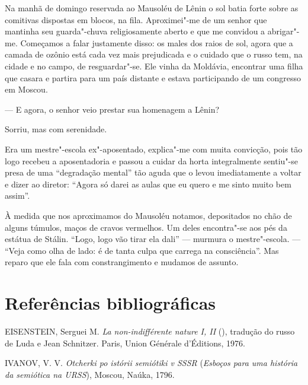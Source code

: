 Na manhã de domingo reservada ao Mausoléu de Lênin o sol batia forte
sobre as comitivas dispostas em blocos, na fila. Aproximei"-me de um
senhor que mantinha seu guarda"-chuva religiosamente aberto e que me
convidou a abrigar"-me. Começamos a falar justamente disso: os males dos
raios de sol, agora que a camada de ozônio está cada vez mais
prejudicada e o cuidado que o russo tem, na cidade e no campo, de
resguardar"-se. Ele vinha da Moldávia, encontrar uma filha que casara e
partira para um país distante e estava participando de um congresso em
Moscou.

--- E agora, o senhor veio prestar sua homenagem a Lênin?

Sorriu, mas com serenidade.

Era um mestre"-escola ex"-aposentado, explica"-me com muita convicção, pois
tão logo recebeu a aposentadoria e passou a cuidar da horta
integralmente sentiu"-se presa de uma ``degradação mental'' tão aguda que
o levou imediatamente a voltar e dizer ao diretor: ``Agora só darei as
aulas que eu quero e me sinto muito bem assim''.

À medida que nos aproximamos do Mausoléu notamos, depositados no chão de
alguns túmulos, maços de cravos vermelhos. Um deles encontra"-se aos pés
da estátua de Stálin. ``Logo, logo vão tirar ela dali'' --- murmura o
mestre"-escola. --- ``Veja como olha de lado: é de tanta culpa que carrega
na consciência''. Mas reparo que ele fala com constrangimento e mudamos
de assunto.

\section{Referências bibliográficas}

EISENSTEIN, Serguei M. \emph{La non-indifférente nature I, II} (),
tradução do russo de Luda e Jean Schnitzer. Paris, Union Générale
d'Éditions, 1976.


IVANOV, V. V. \emph{Otcherki po istórii semiótiki v SSSR} (\emph{Esboços
para uma história da semiótica na URSS}), Moscou, Naúka, 1796.

